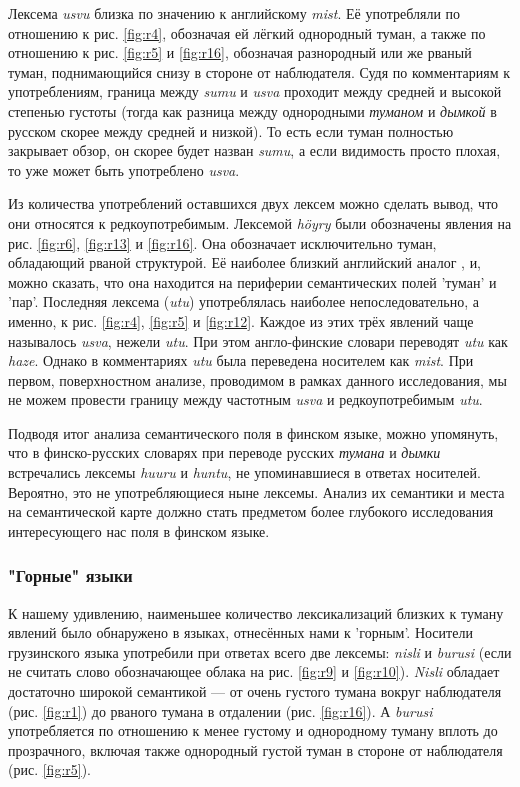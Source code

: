 \par Лексема \textit{usvu} близка по значению к английскому \textit{mist}. Её употребляли по отношению к рис. \ref{fig:r4}, обозначая ей лёгкий однородный туман, а также по отношению к рис. \ref{fig:r5} и \ref{fig:r16}, обозначая разнородный или же рваный туман, поднимающийся снизу в стороне от наблюдателя. Судя по комментариям к употреблениям, граница между \textit{sumu} и \textit{usva} проходит между средней и высокой степенью густоты (тогда как разница между однородными \textit{туманом} и \textit{дымкой} в русском скорее между средней и низкой). То есть если туман полностью закрывает обзор, он скорее будет назван \textit{sumu}, а если видимость просто плохая, то уже может быть употреблено \textit{usva}.

\par Из количества употреблений оставшихся двух лексем можно сделать вывод, что они относятся к редкоупотребимым. Лексемой \textit{höyry} были обозначены явления на рис. \ref{fig:r6}, \ref{fig:r13} и \ref{fig:r16}. Она обозначает исключительно туман, обладающий рваной структурой. Её наиболее близкий английский аналог , и, можно сказать, что она находится на периферии семантических полей 'туман' и 'пар'. Последняя лексема (\textit{utu}) употреблялась наиболее непоследовательно, а именно, к рис. \ref{fig:r4}, \ref{fig:r5} и \ref{fig:r12}. Каждое из этих трёх явлений чаще называлось \textit{usva}, нежели \textit{utu}. При этом англо-финские словари переводят \textit{utu} как \textit{haze}. Однако в комментариях \textit{utu} была переведена носителем как \textit{mist}. При первом, поверхностном анализе, проводимом в рамках данного исследования, мы не можем провести границу между частотным \textit{usva} и редкоупотребимым \textit{utu}.

\par Подводя итог анализа семантического поля в финском языке, можно упомянуть, что в финско-русских словарях при переводе русских \textit{тумана} и \textit{дымки} встречались лексемы \textit{huuru} и \textit{huntu}, не упоминавшиеся в ответах носителей. Вероятно, это не употребляющиеся ныне лексемы. Анализ их семантики и места на семантической карте должно стать предметом более глубокого исследования интересующего нас поля в финском языке.

\subsubsection{"Горные" языки}

\par К нашему удивлению, наименьшее количество лексикализаций близких к туману явлений было обнаружено в языках, отнесённых нами к 'горным'. Носители грузинского языка употребили при ответах всего две лексемы: \textit{nisli} и \textit{burusi} (если не считать слово  обозначающее облака на рис. \ref{fig:r9} и \ref{fig:r10}). \textit{Nisli} обладает достаточно широкой семантикой --- от очень густого тумана вокруг наблюдателя (рис. \ref{fig:r1}) до рваного тумана в отдалении (рис. \ref{fig:r16}). А \textit{burusi} употребляется по отношению к менее густому и однородному туману вплоть до прозрачного, включая также однородный густой туман в стороне от наблюдателя (рис. \ref{fig:r5}).

